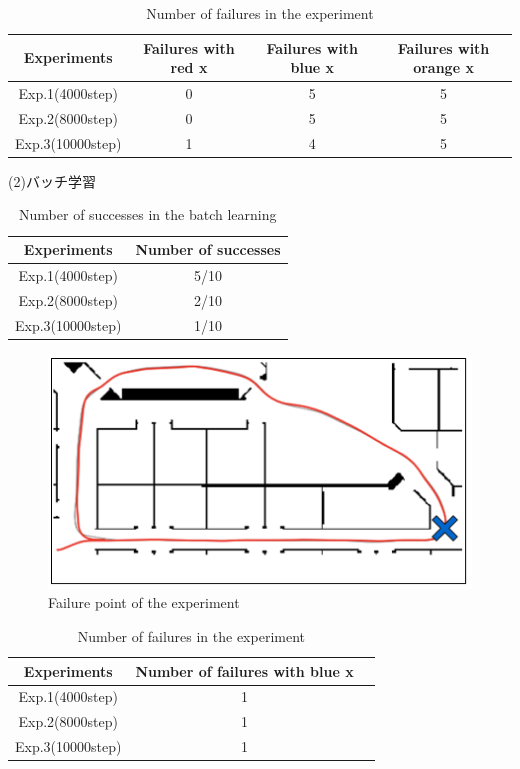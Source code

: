 \begin{table}[h]
  \centering
  \begin{tabular}{|c|c|c|c|} \hline
    Experiments & Failures with red x & Failures with blue x & Failures with orange x\\ \hline
    Exp.1(4000step) & 0 & 5 & 5 \\ \hline
    Exp.2(8000step) & 0 & 5 & 5 \\ \hline
    Exp.3(10000step) & 1 & 4 & 5 \\ \hline
  \end{tabular}
  \caption{Number of failures in the experiment}
  \label{tb:fail1.1}
\end{table}

\newpage
\begin{description}
  \item [(2)バッチ学習]
\end{description}

\begin{table}[h]
  \centering
  \begin{tabular}{|c|c|} \hline
    Experiments & Number of successes \\ \hline
    Exp.1(4000step) & 5/10 \\ \hline
    Exp.2(8000step) & 2/10 \\ \hline
    Exp.3(10000step) & 1/10 \\ \hline
  \end{tabular}
  \caption{Number of successes in the batch learning}
  \label{tb:exp1.2}
\end{table}

\begin{figure}[h]
  \centering
  \includegraphics[keepaspectratio, scale=0.5]{images/result1.2.png}
  \caption{Failure point of the experiment}
  \label{Fig:result1.2}
  \end{figure}

\begin{table}[h]
  \centering
  \begin{tabular}{|c|c|c|} \hline
    Experiments & Number of failures with blue x \\ \hline
    Exp.1(4000step) & 1 \\ \hline
    Exp.2(8000step) & 1 \\ \hline
    Exp.3(10000step) & 1 \\ \hline
  \end{tabular}
  \caption{Number of failures in the experiment}
  \label{tb:fail1.2}
\end{table}

